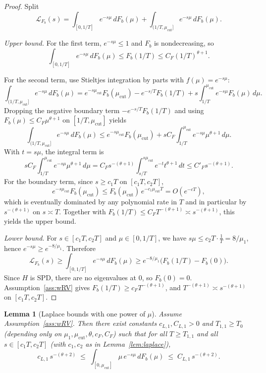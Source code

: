 \documentclass[11pt]{article}
\newtheorem{lemma}{Lemma}
\begin{document}
\begin{proof}
Split
\[
\mathcal L_{F_b}(s)
=\int_{[0,1/T]}e^{-s\mu}\,dF_b(\mu)+\int_{(1/T,\mu_{\mathrm{cut}}]}e^{-s\mu}\,dF_b(\mu).
\]

\emph{Upper bound.}
For the first term, $e^{-s\mu}\le 1$ and $F_b$ is nondecreasing, so
\[
\int_{[0,1/T]}e^{-s\mu}\,dF_b(\mu)\le F_b(1/T)\le C_F (1/T)^{\theta+1}.
\]

For the second term, use Stieltjes integration by parts with $f(\mu)=e^{-s\mu}$:
\[
\int_{(1/T,\mu_{\mathrm{cut}}]} e^{-s\mu}\,dF_b(\mu)
=
e^{-s\mu_{\mathrm{cut}}}F_b(\mu_{\mathrm{cut}})
-e^{-s/T}F_b(1/T)
+s\int_{1/T}^{\mu_{\mathrm{cut}}} e^{-s\mu}F_b(\mu)\,d\mu.
\]
Dropping the negative boundary term $-e^{-s/T}F_b(1/T)$ and using
$F_b(\mu)\le C_F\mu^{\theta+1}$ on $[1/T,\mu_{\mathrm{cut}}]$ yields
\[
\int_{(1/T,\mu_{\mathrm{cut}}]} e^{-s\mu}\,dF_b(\mu)
\le
e^{-s\mu_{\mathrm{cut}}}F_b(\mu_{\mathrm{cut}})
+s C_F\int_{1/T}^{\mu_{\mathrm{cut}}} e^{-s\mu}\mu^{\theta+1}\,d\mu.
\]
With $t=s\mu$, the integral term is
\[
sC_F\int_{1/T}^{\mu_{\mathrm{cut}}} e^{-s\mu}\mu^{\theta+1}\,d\mu
=
C_F s^{-(\theta+1)}\int_{s/T}^{s\mu_{\mathrm{cut}}} e^{-t}t^{\theta+1}\,dt
\le C'_F s^{-(\theta+1)}.
\]
For the boundary term, since $s\ge c_1T$ on $[c_1T,c_2T]$,
\[
e^{-s\mu_{\mathrm{cut}}}F_b(\mu_{\mathrm{cut}})
\le
F_b(\mu_{\mathrm{cut}})\,e^{-c_1\mu_{\mathrm{cut}}T}
=O(e^{-cT}),
\]
which is eventually dominated by any polynomial rate in $T$ and in particular by
$s^{-(\theta+1)}$ on $s\asymp T$.
Together with $F_b(1/T)\le C_FT^{-(\theta+1)}\asymp s^{-(\theta+1)}$, this yields the upper bound.

\medskip
\emph{Lower bound.}
For $s\in[c_1T,c_2T]$ and $\mu\in[0,1/T]$, we have
$s\mu\le c_2T\cdot \frac1T = 8/\mu_1$, hence $e^{-s\mu}\ge e^{-8/\mu_1}$. Therefore
\[
\mathcal L_{F_b}(s)\ge \int_{[0,1/T]} e^{-s\mu}\,dF_b(\mu)
\ge e^{-8/\mu_1}\big(F_b(1/T)-F_b(0)\big).
\]
Since $H$ is SPD, there are no eigenvalues at $0$, so $F_b(0)=0$. Assumption~\ref{ass:wRV}
gives $F_b(1/T)\ge c_F T^{-(\theta+1)}$, and $T^{-(\theta+1)}\asymp s^{-(\theta+1)}$
on $[c_1T,c_2T]$.
\end{proof}

\begin{lemma}[Laplace bounds with one power of $\mu$]\label{lem:laplace-mu}
Assume Assumption~\ref{ass:wRV}. Then there exist constants $c_{L,1},C_{L,1}>0$
and $T_{1,1}\ge T_0$ (depending only on $\mu_1,\mu_{\mathrm{cut}},\theta,c_F,C_F$)
such that for all $T\ge T_{1,1}$ and all $s\in[c_1T,c_2T]$ (with $c_1,c_2$ as in
Lemma~\ref{lem:laplace}),
\[
c_{L,1}\,s^{-(\theta+2)}
\;\le\;
\int_{[0,\mu_{\mathrm{cut}}]} \mu\,e^{-s\mu}\,dF_b(\mu)
\;\le\;
C_{L,1}\,s^{-(\theta+2)}.
\]
\end{lemma}
\end{document}
